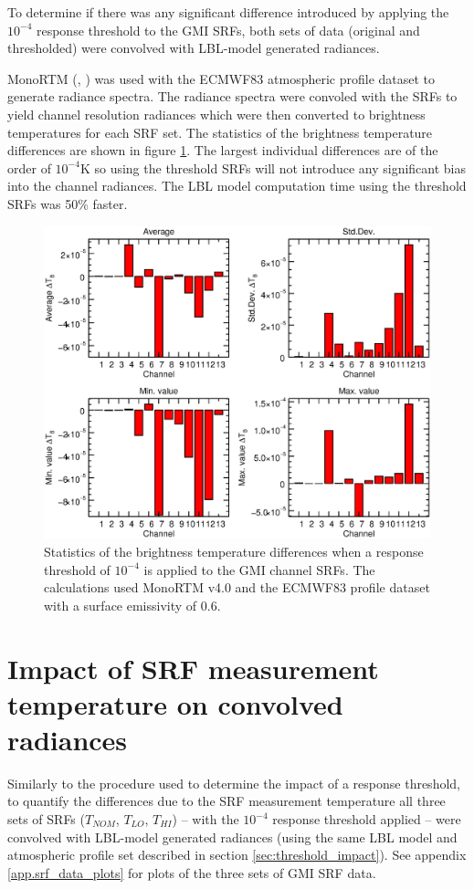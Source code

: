 To determine if there was any significant difference introduced by applying the $10^{-4}$ response threshold to the GMI SRFs, both sets of data (original and thresholded) were convolved with LBL-model generated radiances.

MonoRTM (\cite{MonoRTM1}, \cite{MonoRTM2}) was used with the ECMWF83 atmospheric profile dataset to generate radiance spectra. The radiance spectra were convoled with the SRFs to yield channel resolution radiances which were then converted to brightness temperatures for each SRF set. The statistics of the brightness temperature differences are shown in figure \ref{fig:TNOM_threshold_dTb_stats}. The largest individual differences are of the order of $10^{-4}$K so using the threshold SRFs will not introduce any significant bias into the channel radiances. The LBL model computation time using the threshold SRFs was 50\% faster. 

\begin{figure}[H]
  \centering
  \includegraphics[scale=0.75]{graphics/TNOM_threshold_dTb_stats.eps}
  \caption{Statistics of the brightness temperature differences when a response threshold of $10^{-4}$ is applied to the GMI channel SRFs. The calculations used MonoRTM v4.0 and the ECMWF83 profile dataset with a surface emissivity of 0.6.}
  \label{fig:TNOM_threshold_dTb_stats}
\end{figure}


\newpage
\section{Impact of SRF measurement temperature on convolved radiances}
Similarly to the procedure used to determine the impact of a response threshold, to quantify the differences due to the SRF measurement temperature all three sets of SRFs ($T_{NOM}$, $T_{LO}$, $T_{HI}$) -- with the $10^{-4}$ response threshold applied -- were convolved with LBL-model generated radiances (using the same LBL model and atmospheric profile set described in section \ref{sec:threshold_impact}). See appendix \ref{app.srf_data_plots} for plots of the three sets of GMI SRF data.

